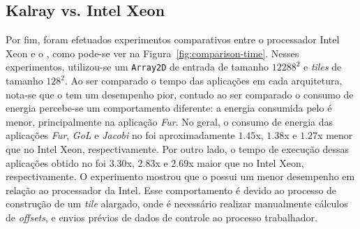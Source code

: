 \subsection{Kalray \mppa vs. Intel Xeon}


Por fim, foram efetuados experimentos comparativos entre o processador Intel
Xeon e o \mppa, como pode-se ver na Figura~\ref{fig:comparison-time}. Nesses
experimentos, utilizou-se um \texttt{Array2D} de entrada de tamanho $12288^2$ e
\textit{tiles} de tamanho $128^2$. Ao ser comparado o tempo das aplicações em
cada arquitetura, nota-se que o \mppa tem um desempenho pior, contudo ao ser
comparado o consumo de energia percebe-se um comportamento diferente: a energia
consumida pelo \mppa é menor, principalmente na aplicação \textit{Fur}. No
geral, o consumo de energia das aplicações \textit{Fur}, \textit{GoL} e
\textit{Jacobi} no \mppa foi aproximadamente $1.45$x, $1.38$x e $1.27$x menor
que no Intel Xeon, respectivamente. Por outro lado, o tempo de execução dessas
aplicações obtido no \mppa foi  $3.30$x, $2.83$x e $2.69$x maior que no Intel
Xeon, respectivamente. O experimento mostrou que o \mppa possui
um menor desempenho em relação ao processador da Intel. Esse comportamento é
devido ao processo de construção de um \textit{tile} alargado, onde é necessário
realizar manualmente cálculos de \textit{offsets}, e envios prévios de dados de
controle ao processo trabalhador.



